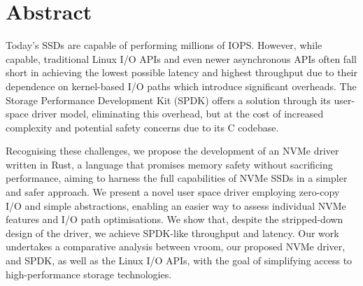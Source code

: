 \chapter{Abstract}
Today's SSDs are capable of performing millions of IOPS. However, while capable, traditional Linux I/O APIs and even newer asynchronous APIs often fall short in achieving the lowest possible latency and highest throughput due to their dependence on kernel-based I/O paths which introduce significant overheads. The Storage Performance Development Kit (SPDK) offers a solution through its user-space driver model, eliminating this overhead, but at the cost of increased complexity and potential safety concerns due to its C codebase.

Recognising these challenges, we propose the development of an NVMe driver written in Rust, a language that promises memory safety without sacrificing performance, aiming to harness the full capabilities of NVMe SSDs in a simpler and safer approach. We present a novel user space driver employing zero-copy I/O and simple abstractions, enabling an easier way to assess individual NVMe features and I/O path optimisations. We show that, despite the stripped-down design of the driver, we achieve SPDK-like throughput and latency. Our work undertakes a comparative analysis between vroom, our proposed NVMe driver, and SPDK, as well as the Linux I/O APIs, with the goal of simplifying access to high-performance storage technologies.
